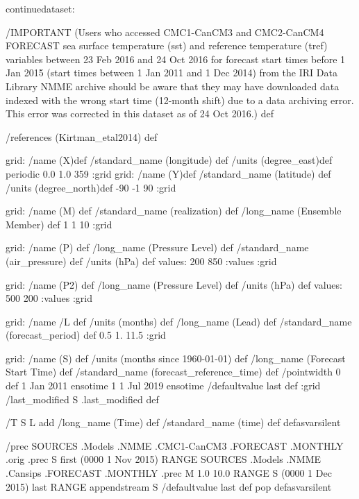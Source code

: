 \begin{ingrid}
continuedataset:

/IMPORTANT (Users who accessed CMC1-CanCM3 and CMC2-CanCM4 FORECAST sea surface temperature (sst) and reference temperature (tref) variables between 23 Feb 2016 and 24 Oct 2016 for forecast start times before 1 Jan 2015 (start times between 1 Jan 2011 and 1 Dec 2014) from the IRI Data Library NMME archive should be aware that they may have downloaded data indexed with the wrong start time (12-month shift) due to a data archiving error.  This error was corrected in this dataset as of 24 Oct 2016.) def

/references (Kirtman_etal2014) def

grid:
/name (X)def
/standard_name (longitude) def
/units (degree_east)def
periodic
 0.0 1.0 359
:grid
grid:
/name (Y)def
/standard_name (latitude) def
/units (degree_north)def
-90 -1 90
:grid

grid:
/name (M) def
/standard_name (realization) def
/long_name (Ensemble Member) def
1 1 10
:grid

grid:
/name (P) def
/long_name (Pressure Level) def
/standard_name (air_pressure) def
/units (hPa) def
values: 200 850 :values
:grid

grid:
/name (P2) def
/long_name (Pressure Level) def
/units (hPa) def
values: 500 200 :values
:grid

grid:
/name /L def
/units (months) def
/long_name (Lead) def
/standard_name (forecast_period) def
0.5 1. 11.5
:grid

grid:
/name (S) def
/units (months since 1960-01-01) def
/long_name (Forecast Start Time) def
/standard_name (forecast_reference_time) def
/pointwidth 0 def
1 Jan 2011 ensotime
1
1 Jul 2019 ensotime
/defaultvalue { last } def
:grid
/last_modified S .last_modified def

/T { S L add
/long_name (Time) def
/standard_name (time) def } defasvarsilent

/prec {
 SOURCES .Models .NMME .CMC1-CanCM3 .FORECAST .MONTHLY .orig .prec
S first (0000 1 Nov 2015) RANGE
 SOURCES .Models .NMME .Cansips .FORECAST .MONTHLY .prec
 M 1.0 10.0 RANGE
S (0000 1 Dec 2015) last RANGE
appendstream
S /defaultvalue last def pop
} defasvarsilent


\end{ingrid}
